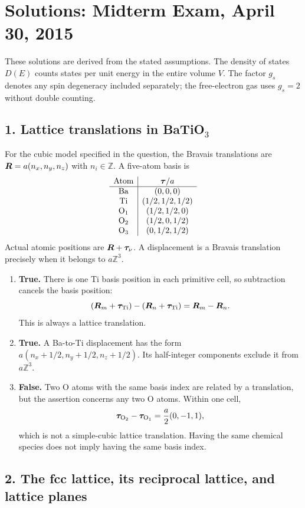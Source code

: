 \chapter{Solutions: Midterm Exam, April 30, 2015}
\label{s:physics-2015-04-midterm}
These solutions are derived from the stated assumptions. The density of states $D(E)$ counts states per unit energy in the entire volume $V$. The factor $g_s$ denotes any spin degeneracy included separately; the free-electron gas uses $g_s=2$ without double counting.

\section*{1. Lattice translations in BaTiO$_3$}
For the cubic model specified in the question, the Bravais translations are
$\boldsymbol{R}=a(n_x,n_y,n_z)$ with $n_i\in\mathbb Z$. A five-atom basis is
\[
\begin{array}{c|c}
\text{Atom}&\boldsymbol{\tau}/a\\ \hline
\mathrm{Ba}&(0,0,0)\\
\mathrm{Ti}&(1/2,1/2,1/2)\\
\mathrm{O}_1&(1/2,1/2,0)\\
\mathrm{O}_2&(1/2,0,1/2)\\
\mathrm{O}_3&(0,1/2,1/2)
\end{array}
\]
Actual atomic positions are $\boldsymbol{R}+\boldsymbol{\tau}_\nu$. A displacement is a Bravais translation precisely when it belongs to $a\mathbb Z^3$.
\begin{enumerate}[label=(\alph*)]
\item \textbf{True.} There is one Ti basis position in each primitive cell, so subtraction cancels the basis position:
\[
(\boldsymbol{R}_m+\boldsymbol{\tau}_{\rm Ti})-(\boldsymbol{R}_n+\boldsymbol{\tau}_{\rm Ti})=\boldsymbol{R}_m-\boldsymbol{R}_n.
\]
This is always a lattice translation.
\item \textbf{True.} A Ba-to-Ti displacement has the form
$a(n_x+1/2,n_y+1/2,n_z+1/2)$. Its half-integer components exclude it from $a\mathbb Z^3$.
\item \textbf{False.} Two O atoms with the same basis index are related by a translation, but the assertion concerns any two O atoms. Within one cell,
\[
\boldsymbol{\tau}_{\mathrm O_2}-\boldsymbol{\tau}_{\mathrm O_1}=\frac a2(0,-1,1),
\]
which is not a simple-cubic lattice translation. Having the same chemical species does not imply having the same basis index.
\end{enumerate}

\section*{2. The fcc lattice, its reciprocal lattice, and lattice planes}
